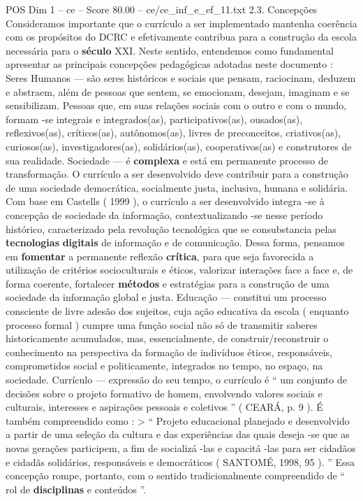 \begin{textsample}{POS Dim 1 – ce – Score 80.00 – ce/ce\_inf\_e\_ef\_11.txt}  \label{ex:f1_pos_041}
2.3.
Concepções Consideramos importante que o currículo a ser implementado mantenha coerência com os propósitos do DCRC e efetivamente contribua para a construção da escola necessária para o \textbf{século} XXI.
Neste sentido, entendemos como fundamental apresentar as principais concepções pedagógicas adotadas neste documento : Seres Humanos — são seres históricos e sociais que pensam, raciocinam, deduzem e abstraem, além de pessoas que sentem, se emocionam, desejam, imaginam e se sensibilizam.
Pessoas que, em suas relações sociais com o outro e com o mundo, formam -se integrais e integrados(as), participativos(as), ousados(as), reflexivos(as), críticos(as), autônomos(as), livres de preconceitos, criativos(as), curiosos(as), investigadores(as), solidários(as), cooperativos(as) e construtores de sua realidade.
Sociedade — é \textbf{complexa} e está em permanente processo de transformação.
O currículo a ser desenvolvido deve contribuir para a construção de uma sociedade democrática, socialmente justa, inclusiva, humana e solidária.
Com base em Castells ( 1999 ), o currículo a ser desenvolvido integra -se à concepção de sociedade da informação, contextualizando -se nesse período histórico, caracterizado pela revolução tecnológica que se consubstancia pelas \textbf{tecnologias} \textbf{digitais} de informação e de comunicação.
Dessa forma, pensamos em \textbf{fomentar} a permanente reflexão \textbf{crítica}, para que seja favorecida a utilização de critérios socioculturais e éticos, valorizar interações face a face e, de forma coerente, fortalecer \textbf{métodos} e estratégias para a construção de uma sociedade da informação global e justa.
Educação — constitui um processo consciente de livre adesão dos sujeitos, cuja ação educativa da escola ( enquanto processo formal ) cumpre uma função social não só de transmitir saberes historicamente acumulados, mas, essencialmente, de construir/reconstruir o conhecimento na perspectiva da formação de indivíduos éticos, responsáveis, comprometidos social e politicamente, integrados no tempo, no espaço, na sociedade.
Currículo — expressão do seu tempo, o currículo é “ um conjunto de decisões sobre o projeto formativo de homem, envolvendo valores sociais e culturais, interesses e aspirações pessoais e coletivos ” ( CEARÁ, p. 9 ).
É também compreendido como : > “ Projeto educacional planejado e desenvolvido a partir de uma seleção da cultura e das experiências das quais deseja -se que as novas gerações participem, a fim de socializá -las e capacitá -las para ser cidadãos e cidadãs solidários, responsáveis e democráticos ( SANTOMÉ, 1998, 95 ). ” Essa concepção rompe, portanto, com o sentido tradicionalmente compreendido de “ rol de \textbf{disciplinas} e conteúdos ”.

\end{textsample}
